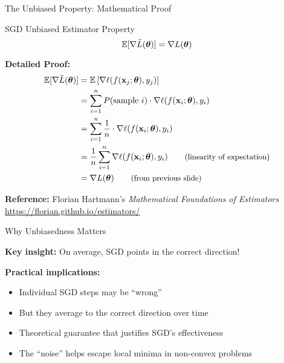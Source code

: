 \documentclass[usenames,dvipsnames]{beamer}
\newcommand{\E}{\mathbb{E}}
\begin{document}
  \begin{frame}{The Unbiased Property: Mathematical Proof}
    \begin{theorembox}{SGD Unbiased Estimator Property}
    $$\E[\nabla \tilde{L}(\vtheta)] = \nabla L(\vtheta)$$
    \end{theorembox}

    \pause
    \textbf{Detailed Proof:}
    \begin{align}
    \E[\nabla \tilde{L}(\vtheta)] &= \E\left[\nabla \ell(f(\vx_j;\vtheta),y_j)\right]\\
    &= \sum_{i=1}^n P(\text{sample } i) \cdot \nabla \ell(f(\vx_i;\vtheta),y_i)\\
    &= \sum_{i=1}^n \frac{1}{n} \cdot \nabla \ell(f(\vx_i;\vtheta),y_i)\\
    &= \frac{1}{n}\sum_{i=1}^n \nabla \ell(f(\vx_i;\vtheta),y_i) \qquad \text{\small (linearity of expectation)}\\
    &= \nabla L(\vtheta) \qquad \text{\small (from previous slide)}
    \end{align}

    \pause
    \textbf{Reference:} Florian Hartmann's \emph{Mathematical Foundations of Estimators} \\
    \url{https://florian.github.io/estimators/}
  \end{frame}

  \begin{frame}{Why Unbiasedness Matters}
    \begin{keypointsbox}{}
    \textbf{Key insight:} On average, SGD points in the correct direction!
    \end{keypointsbox}
    
    \pause
    \textbf{Practical implications:}
    \begin{itemize}[<+->]
        \item Individual SGD steps may be ``wrong''
        \item But they average to the correct direction over time
        \item Theoretical guarantee that justifies SGD's effectiveness
        \item The ``noise'' helps escape local minima in non-convex problems
    \end{itemize}
  \end{frame}
\end{document}
